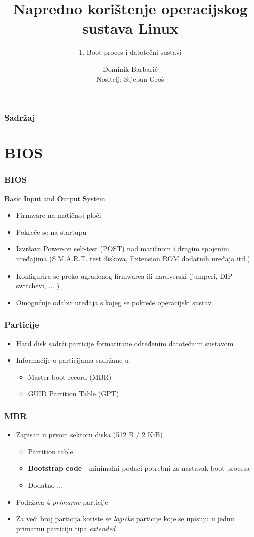 \documentclass[t]{beamer}
\date{\todayiso}
\title[NKOSL]{Napredno korištenje operacijskog sustava Linux}
\author[Dominik Barbarić]{Dominik Barbarić\\{\small Nositelj: Stjepan Groš}}
\subtitle{1. Boot proces i datotečni sustavi}
\institute[FER]{Sveučilište u Zagrebu\\Fakultet elektrotehnike i računarstva}
\begin{document}
{
	\begin{frame}
		\maketitle
	\end{frame}
}

\begin{frame}
	\frametitle{Sadržaj}
	\tableofcontents
\end{frame}

\section{BIOS}
\begin{frame}
	\frametitle{BIOS}
	\textbf{B}asic \textbf{I}nput and \textbf{O}utput \textbf{S}ystem
	\begin{itemize}
		\item Firmware na matičnoj ploči
		\item Pokreće se na startupu
		\item Izvršava Power-on self-test (POST) nad matičnom i drugim spojenim uređajima (S.M.A.R.T. test diskova, Extension ROM dodatnih uređaja itd.)
		\item Konfigurira se preko ugrađenog firmwarea ili hardverski (jumperi, DIP switchevi, ... )
		\item Omogućuje odabir uređaja s kojeg se pokreće operacijski sustav
	\end{itemize}
\end{frame}

\begin{frame}
	\frametitle{Particije}
	\begin{itemize}
		\item Hard disk sadrži particije formatirane određenim datotečnim sustavom
		\item Informacije o particijama sadržane u
		\begin{itemize}
			\item Master boot record (MBR)
			\item GUID Partition Table (GPT)
		\end{itemize}
	\end{itemize}
\end{frame}	

\begin{frame}
	\frametitle{MBR}
	\begin{itemize}
		\item Zapisan u prvom sektoru diska (512 B / 2 KiB)
		\begin{itemize}
			\item Partition table
			\item \textbf{Bootstrap code} - minimalni podaci potrebni za nastavak boot procesa
			\item Dodatno ...
		\end{itemize}
		\item Podržava 4 \emph{primarne} particije
		\item Za veći broj particija koriste se \emph{logičke} particije koje se upisuju u jednu primarnu particiju tipa \emph{extended}
	\end{itemize}
\end{frame}
\end{document}
